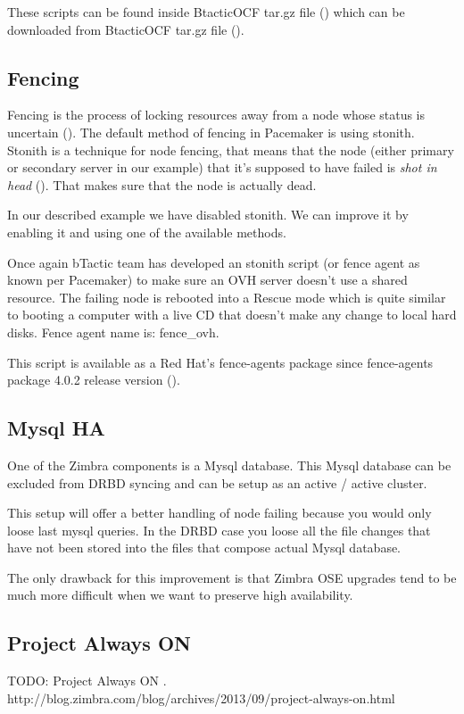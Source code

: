 These scripts can be found inside BtacticOCF tar.gz file (\cite{BtacticOCF}) which can be downloaded from BtacticOCF  tar.gz file (\cite{BtacticOrg}).

\subsection {Fencing}
Fencing is the process of locking resources away from a node whose status is uncertain (\cite{LinuxHAFencing}). The default method of fencing in Pacemaker is using stonith. Stonith is a technique for node fencing, that means that the node (either primary or secondary server in our example) that it's supposed to have failed is \textit{shot in head} (\cite{LinuxHAStonith}). That makes sure that the node is actually dead.

In our described example we have disabled stonith. We can improve it by enabling it and using one of the available methods.

Once again bTactic team has developed an stonith script (or fence agent as known per Pacemaker) to make sure an OVH server doesn't use a shared resource. The failing node is rebooted into a Rescue mode which is quite similar to booting a computer with a live CD that doesn't make any change to local hard disks. Fence agent name is: fence\_ovh.

This script is available as a Red Hat's fence-agents package since fence-agents package 4.0.2 release version (\cite{LinuxClusterML201307}).

\subsection {Mysql HA}
One of the Zimbra components is a Mysql database. This Mysql database can be excluded from DRBD syncing and can be setup as an active / active cluster.

This setup will offer a better handling of node failing because you would only loose last mysql queries. In the DRBD case you loose all the file changes that have not been stored into the files that compose actual Mysql database.

The only drawback for this improvement is that Zimbra OSE upgrades tend to be much more difficult when we want to preserve high availability.

\subsection {Project Always ON}

TODO: Project Always ON . http://blog.zimbra.com/blog/archives/2013/09/project-always-on.html